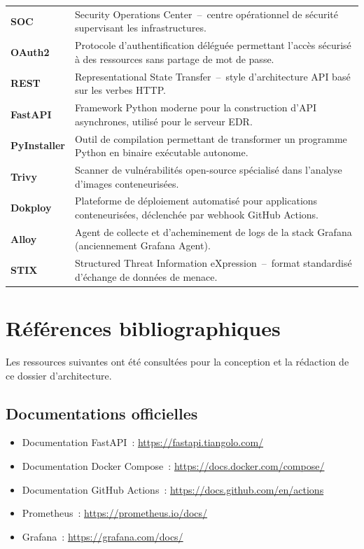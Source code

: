 \begin{longtable}{lp{10cm}}
  \textbf{SOC}
  & Security Operations Center~--~centre opérationnel de sécurité
  supervisant les infrastructures. \\

  \textbf{OAuth2}
  & Protocole d'authentification déléguée permettant l'accès sécurisé à
  des ressources sans partage de mot de passe. \\

  \textbf{REST}
  & Representational State Transfer~--~style d'architecture API basé sur
  les verbes HTTP. \\

  \textbf{FastAPI}
  & Framework Python moderne pour la construction d'API asynchrones,
  utilisé pour le serveur EDR. \\

  \textbf{PyInstaller}
  & Outil de compilation permettant de transformer un programme Python en
  binaire exécutable autonome. \\

  \textbf{Trivy}
  & Scanner de vulnérabilités open-source spécialisé dans l'analyse
  d'images conteneurisées. \\

  \textbf{Dokploy}
  & Plateforme de déploiement automatisé pour applications
  conteneurisées, déclenchée par webhook GitHub Actions. \\

  \textbf{Alloy}
  & Agent de collecte et d'acheminement de logs de la stack Grafana
  (anciennement Grafana Agent). \\

  \textbf{STIX}
  & Structured Threat Information eXpression~--~format standardisé
  d'échange de données de menace. \\

\end{longtable}

\section{Références bibliographiques}

Les ressources suivantes ont été consultées pour la conception et la
rédaction de ce dossier d'architecture.

\subsection*{Documentations officielles}

\begin{itemize}
  \item Documentation FastAPI~: \url{https://fastapi.tiangolo.com/}
  \item Documentation Docker Compose~: \url{https://docs.docker.com/compose/}
  \item Documentation GitHub Actions~: \url{https://docs.github.com/en/actions}
  \item Prometheus~: \url{https://prometheus.io/docs/}
  \item Grafana~: \url{https://grafana.com/docs/}
\end{itemize}


